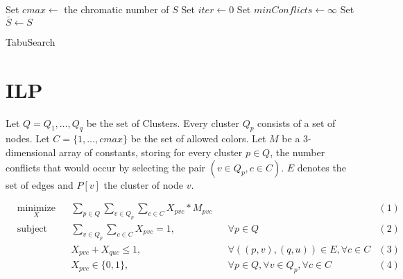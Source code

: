 \documentclass{article}
\begin{document}
\begin{algorithm}
Set $cmax \gets$ the chromatic number of $S$\;
Set $iter \gets 0$\;
Set $minConflicts \gets \infty$\;
Set $\bar{S} \gets S$\;

\;
\caption{{\sc TabuSearch}}
\label{algo:tabusearch}
\end{algorithm}

\FloatBarrier
\section{ILP}

Let $Q = {Q_1,\ldots,Q_q}$ be the set of Clusters. Every cluster $Q_p$ consists of a set of nodes. Let $C=\{1,\ldots,cmax\}$ be the
set of allowed colors. Let $M$ be a 3-dimensional array of constants, storing
for every cluster $p \in Q$, the number conflicts that would occur by selecting the pair $(v \in Q_p, c \in C)$.
$E$ denotes the set of edges and $P[v]$ the cluster of node $v$.

\begin{equation*}
\begin{aligned}
& \underset{X}{\text{minimize}} && \sum_{p \in Q}\sum_{v \in Q_p}\sum_{c \in C} X_{pvc} * M_{pvc}                    &&&(1)\\
& \text{subject to} && \sum_{v \in Q_p}\sum_{c \in C} X_{pvc}=1, && \forall p \in Q    &(2)\\
&&& X_{pvc}+X_{quc} \leq 1, && \forall ((p,v),(q,u)) \in E, \forall c \in C     &(3)\\
&&& X_{pvc} \in \{0,1\}, && \forall p \in Q, \forall v \in Q_p, \forall c \in C         &(4)
\end{aligned}
\end{equation*}
\end{document}
